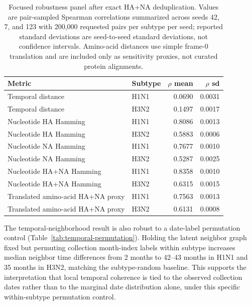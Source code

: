 \documentclass[11pt]{article}
\begin{document}
\begin{table}[H]
\centering
\caption{Focused robustness panel after exact HA+NA deduplication. Values are pair-sampled Spearman correlations summarized across seeds 42, 7, and 123 with 200,000 requested pairs per subtype per seed; reported standard deviations are seed-to-seed standard deviations, not confidence intervals. Amino-acid distances use simple frame-0 translation and are included only as sensitivity proxies, not curated protein alignments.}
\label{tab:robust-spearman}
\begin{tabular}{llrr}
\toprule
Metric & Subtype & $\rho$ mean & $\rho$ sd \\
\midrule
Temporal distance & H1N1 & 0.0690 & 0.0031 \\
Temporal distance & H3N2 & 0.1497 & 0.0017 \\
Nucleotide HA Hamming & H1N1 & 0.8086 & 0.0013 \\
Nucleotide HA Hamming & H3N2 & 0.5883 & 0.0006 \\
Nucleotide NA Hamming & H1N1 & 0.7677 & 0.0010 \\
Nucleotide NA Hamming & H3N2 & 0.5287 & 0.0025 \\
Nucleotide HA+NA Hamming & H1N1 & 0.8358 & 0.0010 \\
Nucleotide HA+NA Hamming & H3N2 & 0.6315 & 0.0015 \\
Translated amino-acid HA+NA proxy & H1N1 & 0.7563 & 0.0013 \\
Translated amino-acid HA+NA proxy & H3N2 & 0.6131 & 0.0008 \\
\bottomrule
\end{tabular}
\end{table}

The temporal-neighborhood result is also robust to a date-label permutation control (Table~\ref{tab:temporal-permutation}). Holding the latent neighbor graph fixed but permuting collection month-index labels within subtype increases median neighbor time differences from 2 months to 42--43 months in H1N1 and 35 months in H3N2, matching the subtype-random baseline. This supports the interpretation that local temporal coherence is tied to the observed collection dates rather than to the marginal date distribution alone, under this specific within-subtype permutation control.
\end{document}
